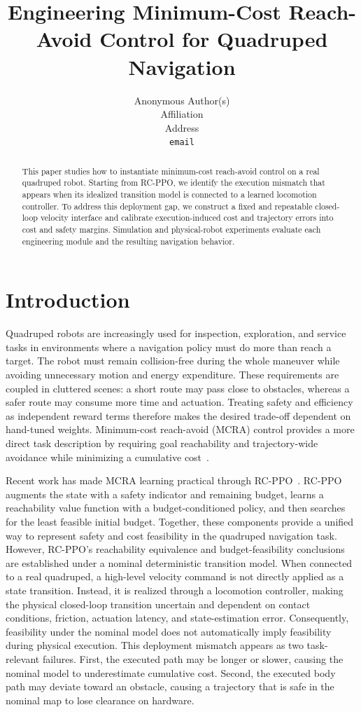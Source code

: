 \documentclass{article}
\title{Engineering Minimum-Cost Reach-Avoid Control for Quadruped Navigation}
\author{
  Anonymous Author(s)\\
  Affiliation\\
  Address\\
  \texttt{email}
}
\begin{document}
\maketitle

\begin{abstract}
This paper studies how to instantiate minimum-cost reach-avoid control on a real quadruped robot. Starting from RC-PPO, we identify the execution mismatch that appears when its idealized transition model is connected to a learned locomotion controller. To address this deployment gap, we construct a fixed and repeatable closed-loop velocity interface and calibrate execution-induced cost and trajectory errors into cost and safety margins. Simulation and physical-robot experiments evaluate each engineering module and the resulting navigation behavior.
\end{abstract}


\section{Introduction}
Quadruped robots are increasingly used for inspection, exploration, and service
tasks in environments where a navigation policy must do more than reach a target.
The robot must remain collision-free during the whole maneuver while avoiding
unnecessary motion and energy expenditure. These requirements are coupled in
cluttered scenes: a short route may pass close to obstacles, whereas a safer route
may consume more time and actuation. Treating safety and efficiency as independent
reward terms therefore makes the desired trade-off dependent on hand-tuned weights.
Minimum-cost reach-avoid (MCRA) control provides a more direct task description by
requiring goal reachability and trajectory-wide avoidance while minimizing a
cumulative cost~\citep{bansal2017,ganai2024survey}.

Recent work has made MCRA learning practical through RC-PPO~\citep{so2024}.
RC-PPO augments the state with a safety indicator and remaining budget, learns a
reachability value function with a budget-conditioned policy, and then searches for
the least feasible initial budget. Together, these components provide a unified way
to represent safety and cost feasibility in the quadruped navigation task. However,
RC-PPO's reachability equivalence and budget-feasibility conclusions are established
under a nominal deterministic transition model. When connected to a real
quadruped, a high-level velocity command is not directly applied as a state
transition. Instead, it is realized through a locomotion controller, making the
physical closed-loop transition uncertain and dependent on contact conditions,
friction, actuation latency, and state-estimation error. Consequently, feasibility
under the nominal model does not automatically imply feasibility during physical
execution. This deployment mismatch appears as two task-relevant failures. First,
the executed path may be longer or slower, causing the nominal model to
underestimate cumulative cost. Second, the executed body path may deviate toward
an obstacle, causing a trajectory that is safe in the nominal map to lose clearance
on hardware.
\end{document}
